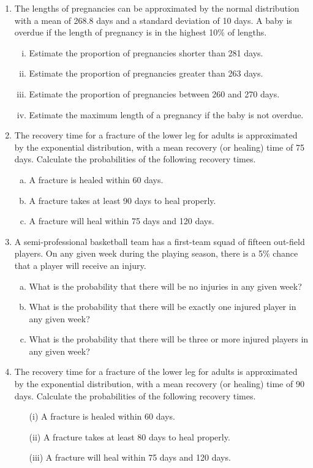 \documentclass[a4paper,12pt]{article}
\begin{document}
\begin{enumerate}
\item The lengths of pregnancies can be approximated by the normal distribution with a mean of 268.8 days and a standard deviation of 10 days. A baby is overdue if the length of pregnancy is in the highest 10\% of lengths. 

\begin{enumerate}[(i)]
\item Estimate the proportion of pregnancies shorter than 281 days.
\item Estimate the proportion of pregnancies greater than 263 days.
\item Estimate the proportion of pregnancies between 260 and 270 days.
\item Estimate the maximum length of a pregnancy if the baby is not overdue. 
\end{enumerate}

\item 
The recovery time for a fracture of the lower leg for adults 
is approximated by the exponential distribution, with a mean recovery (or healing) time of 75 days.
Calculate the probabilities of the following recovery times.
\begin{enumerate}[(a)]
\item A fracture is healed within 60 days.
\item A fracture takes at least 90 days to heal properly.
\item A fracture will heal within 75 days and 120 days.
\end{enumerate}

\item A semi-professional basketball team has a first-team squad of fifteen out-field players.
On any given week during the playing season, there is a 5\% chance that a player will receive an injury.
\begin{enumerate}[(a)]
\item What is the probability that there will be no injuries in any given week?
\item What is the probability that there will be exactly one injured player in any given week?
\item What is the probability that there will be three or more injured players in any given week?
\end{enumerate}
\item 
The recovery time for a fracture of the lower leg for adults 
is approximated by the exponential distribution, with a mean recovery (or healing) time of 90 days.
Calculate the probabilities of the following recovery times.
\begin{itemize}
\item [(i)]A fracture is healed within 60 days.
\item [(ii)]A fracture takes at least 80 days to heal properly.
\item [(iii)]A fracture will heal within 75 days and 120 days.
\end{itemize}


\end{enumerate}
\end{document}
